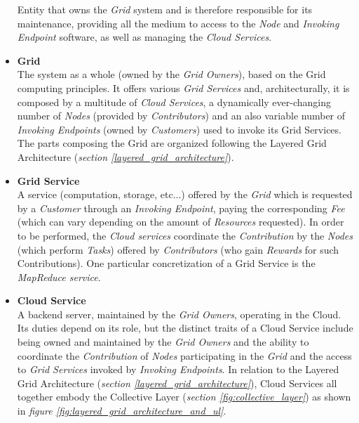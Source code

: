\begin{itemize}
    Entity that owns the \textit{Grid} system and is therefore responsible for its maintenance, providing all the medium to access to the \textit{Node} and \textit{Invoking Endpoint} software, as well as managing the \textit{Cloud Services}.
    \item \textbf{Grid}\label{grid}\\
    The system as a whole (owned by the \textit{Grid Owners}), based on the Grid computing principles. It offers various \textit{Grid Services} and, architecturally, it is composed by a multitude of \textit{Cloud Services}, a dynamically ever-changing number of \textit{Nodes} (provided by \textit{Contributors}) and an also variable number of \textit{Invoking Endpoints} (owned by \textit{Customers}) used to invoke its Grid Services. The parts composing the Grid are organized following the Layered Grid Architecture (\textit{section \ref{layered_grid_architecture}}).
    \item \textbf{Grid Service}\label{grid_service}\\
    A service (computation, storage, etc...) offered by the \textit{Grid} which is requested by a \textit{Customer} through an \textit{Invoking Endpoint}, paying the corresponding \textit{Fee} (which can vary depending on the amount of \textit{Resources} requested). In order to be performed, the \textit{Cloud services} coordinate the \textit{Contribution} by the \textit{Nodes} (which perform \textit{Tasks}) offered by \textit{Contributors} (who gain \textit{Rewards} for such Contributions). One particular concretization of a Grid Service is the \textit{MapReduce service}.
    \item \textbf{Cloud Service}\label{cloud_service}\\
    A backend server, maintained by the \textit{Grid Owners}, operating in the Cloud. Its duties depend on its role, but the distinct traits of a Cloud Service include being owned and maintained by the \textit{Grid Owners} and the ability to coordinate the \textit{Contribution} of \textit{Nodes} participating in the \textit{Grid} and the access to \textit{Grid Services} invoked by \textit{Invoking Endpoints}. In relation to the Layered Grid Architecture (\textit{section \ref{layered_grid_architecture}}), Cloud Services all together embody the Collective Layer (\textit{section \ref{fig:collective_layer}}) as shown in \textit{figure \ref{fig:layered_grid_architecture_and_ul}}.
    \begin{figure}[!ht]
        \centering

\end{figure}
\end{itemize}
